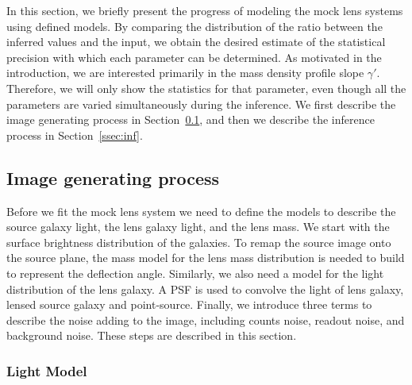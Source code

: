 \documentclass[a4paper,11pt]{article}
\begin{document}
In this section, we briefly present the progress of modeling the mock
lens systems using defined models. By comparing the distribution of
the ratio between the inferred values and the input, we obtain the
desired estimate of the statistical precision with which each
parameter can be determined. As motivated in the introduction, we are
interested primarily in the mass density profile slope
$\gamma'$. Therefore, we will only show the statistics for that
parameter, even though all the parameters are varied simultaneously
during the inference. We first describe the image generating process
in Section~\ref{ssec:image}, and then we describe the inference process in
Section~\ref{ssec:inf}.

\subsection{Image generating process}
\label{ssec:image}

Before we fit the mock lens system we need to define the models to
describe the source galaxy light, the lens galaxy light, and the lens
mass. We start with the surface brightness distribution of the
galaxies. To remap the source image onto the source plane, the mass
model for the lens mass distribution is needed to build to represent
the deflection angle. Similarly, we also need a model for the light
distribution of the lens galaxy. A PSF is used to convolve the light
of lens galaxy, lensed source galaxy and point-source. Finally, we
introduce three terms to describe the noise adding to the image,
including counts noise, readout noise, and background noise. These
steps are described in this section.

\subsubsection{Light Model}
\end{document}
